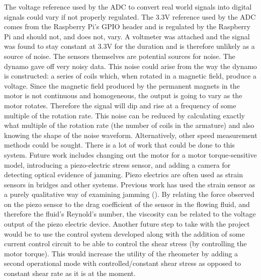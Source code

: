 \documentclass[twoside,a4]{report}
\def\br{\newline \newline \noindent}
\begin{document}
	\br
	The voltage reference used by the ADC to convert real world signals into digital signals could vary if not properly regulated. The 3.3V reference used by the ADC comes from the Raspberry Pi's GPIO header and is regulated by the Raspberry Pi and should not, and does not, vary. A voltmeter was attached and the signal was found to stay constant at 3.3V for the duration and is therefore unlikely as a source of noise. 
	\br
	The sensors themselves are potential sources for noise. The dynamo gave off very noisy data. This noise could arise from the way the dynamo is constructed: a series of coils which, when rotated in a magnetic field, produce a voltage. Since the magnetic field produced by the permanent magnets in the motor is not continuous and homogeneous, the output is going to vary as the motor rotates. Therefore the signal will dip and rise at a frequency of some multiple of the rotation rate. This noise can be reduced by calculating exactly what multiple of the rotation rate (the number of coils in the armature) and also knowing the shape of the noise waveform. Alternatively, other speed measurement methods could be sought. 
	\br %
	There is a lot of work that could be done to this system. Future work includes changing out the motor for a motor torque-sensitive model, introducing a piezo-electric stress sensor, and adding a camera for detecting optical evidence of jamming. Piezo electrics are often used as strain sensors in bridges and other systems. Previous work has used the strain sensor as a purely qualitative way of examining jamming (\cite{thescforsyth}). By relating the force observed on the piezo sensor to the drag coefficient of the sensor in the flowing fluid, and therefore the fluid's Reynold's number, the viscosity can be related to the voltage output of the piezo electric device. 
	\br
	Another future step to take with the project would be to use the control system developed along with the addition of some current control circuit to be able to control the shear stress (by controlling the motor torque). This would increase the utility of the rheometer by adding a second operational mode with controlled/constant shear stress as opposed to constant shear rate as it is at the moment.
	
\end{document}
